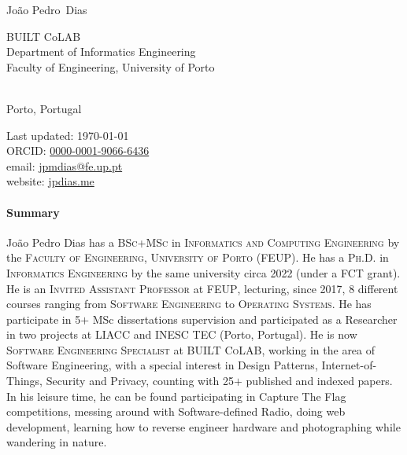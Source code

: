 \documentclass[10pt,a4paper]{article}
\makeatletter
\newcommand{\FEUP}{Faculty of Engineering, University of Porto}
\newcommand{\FirstName}{João Pedro}
\newcommand{\LastName}{Dias}
\newcommand{\MyName}{\FirstName\ \LastName}
\newcommand{\Email}{jpmdias@fe.up.pt}
\newcommand{\Website}{jpdias.me}
\newcommand{\ORCID}{0000-0001-9066-6436}
\newcommand{\Affiliation}{
    \adforn{10} BUILT CoLAB\\
    \adforn{10} Department of Informatics Engineering
    \\
    \FEUP
}
\newcommand{\Address}{
    \small{Porto, Portugal}
}
\makeatother
\begin{document}
\thispagestyle{firststyle}

{\color{awesome}\fontsize{24pt}{0}\selectfont\MyName \hfill {}}\\

\begin{minipage}[t]{0.595\textwidth}
    \Affiliation
    \\
    \Address
\end{minipage}
\begin{minipage}[t]{0.4\textwidth}
    \begin{flushright}
		Last updated: \monthyear\today
		\\
        ORCID: \href{https://orcid.org/\ORCID}{\ORCID}
        \\
        email: \href{mailto:\Email}{\Email}
        \\
        website: \href{https://\Website}{\Website}
    \end{flushright}
\end{minipage}
\begin{center}
    \color{awesome} 
    \vspace{-0.5cm}
\end{center}

\paragraph{Summary} \begin{small} João Pedro Dias has a \textsc{BSc}+\textsc{MSc} in \textsc{Informatics and Computing Engineering} by the \textsc{Faculty of Engineering, University of Porto} (\textsc{FEUP}). He has a \textsc{Ph.D.} in \textsc{Informatics Engineering} by the same university circa 2022 (under a \textsc{FCT} grant). He is an \textsc{Invited Assistant Professor} at \textsc{FEUP}, lecturing, since 2017, 8 different courses ranging from \textsc{Software Engineering} to \textsc{Operating Systems}. He has participate in 5$+$ MSc dissertations supervision and participated as a Researcher in two projects at \textsc{LIACC} and \textsc{INESC TEC} (Porto, Portugal). He is now \textsc{Software Engineering Specialist} at \textsc{BUILT CoLAB}, working in the area of Software Engineering, with a special interest in Design Patterns, Internet-of-Things, Security and Privacy, counting with 25$+$ published and indexed papers. In his leisure time, he can be found participating in Capture The Flag competitions, messing around with Software-defined Radio, doing web development, learning how to reverse engineer hardware and photographing while wandering in nature. \end{small}
\end{document}
